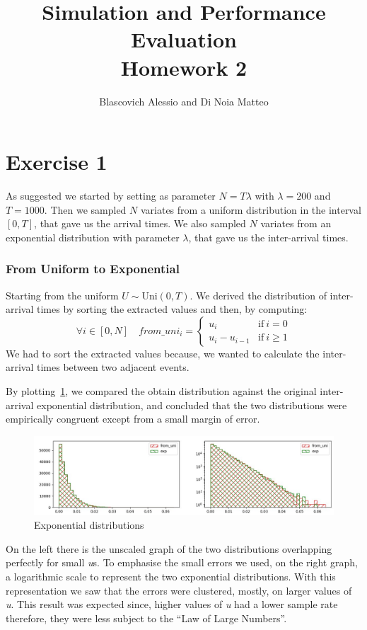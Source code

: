 \documentclass[10pt,a4paper]{article}
\title{
  {\Huge Simulation and Performance Evaluation}\\
  \huge Homework 2 \\
}
\author{Blascovich Alessio and Di Noia Matteo}
\begin{document}
\maketitle

\section*{Exercise 1}

As suggested we started by setting as parameter \(N=T\lambda\) with \(\lambda = 200\) and \(T = 1000\). Then we sampled \(N\) variates from a uniform distribution in the interval \([0,T]\), that gave us the arrival times. We also sampled \(N\) variates from an exponential distribution with parameter \(\lambda\), that gave us the inter-arrival times.
\subsubsection*{From Uniform to Exponential}
Starting from the uniform \(U\sim\text{Uni}(0, T)\). We derived the distribution of inter-arrival times by sorting the extracted values and then, by computing:
\begin{equation*}
  \forall i\in[0,N]\quad from\_uni_{i} =
  \begin{cases}
    u_{i} & \text{if}\ i = 0\\
    u_{i} - u_{i-1} & \text{if}\ i\geq 1
  \end{cases}
\end{equation*}
We had to sort the extracted values because, we wanted to calculate the inter-arrival times between two adjacent events.

By plotting~\ref{fig:1}, we compared the obtain distribution against the original inter-arrival exponential distribution, and concluded that the two distributions were empirically congruent except from a small margin of error.

\begin{figure}[h]
  \centering
  \includegraphics[scale=0.5]{es1-1.png}
  \caption{Exponential distributions}
  \label{fig:1}
\end{figure}

On the left there is the unscaled graph of the two distributions overlapping perfectly for small \emph{u}s. To emphasise the small errors we used, on the right graph, a logarithmic scale to represent the two exponential distributions. With this representation we saw that the errors were clustered, mostly, on larger values of \emph{u}. This result was expected since, higher values of \emph{u} had a lower sample rate therefore, they were less subject to the ``Law of Large Numbers''.
\end{document}
